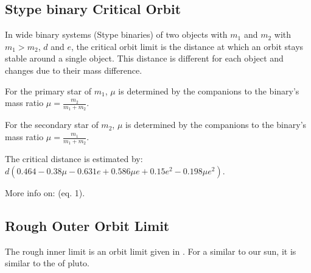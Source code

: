\documentclass[letterpaper,10pt,english]{sphinxmanual}
\begin{document}
\subsection{S\sphinxhyphen{}type binary Critical Orbit}
\label{\detokenize{quantities/children_orbit_limits/s_type_critical_orbit:s-type-binary-critical-orbit}}\label{\detokenize{quantities/children_orbit_limits/s_type_critical_orbit::doc}}\label{\detokenize{quantities/children_orbit_limits/s_type_critical_orbit:s-type-critical-orbit}}
\sphinxAtStartPar
In wide binary systems (S\sphinxhyphen{}type binaries) of two objects with {\hyperref[\detokenize{quantities/material/mass:id1}]{}}
\(m_1\) and \(m_2\) with \(m_1 > m_2\), {\hyperref[\detokenize{quantities/orbital/semi_major_axis:id1}]{}} \(d\)
and {\hyperref[\detokenize{quantities/orbital/eccentricity:id1}]{}} \(e\), the critical orbit limit is the 
distance at which an orbit stays stable around a single object.
This distance is different for each object and changes due to their mass difference.

\sphinxAtStartPar
For the primary star of {\hyperref[\detokenize{quantities/material/mass:id1}]{}} \(m_1\), \(\mu\) is determined
by the companions to the binary’s mass ratio \(\mu = \frac{m_2}{m_1 + m_2}\).

\sphinxAtStartPar
For the secondary star of {\hyperref[\detokenize{quantities/material/mass:id1}]{}} \(m_2\), \(\mu\) is determined
by the companions to the binary’s mass ratio \(\mu = \frac{m_1}{m_1 + m_2}\).

\sphinxAtStartPar
The critical distance is estimated by: \(d (0.464 - 0.38 \mu - 0.631 e + 0.586 \mu e + 0.15 e^2 - 0.198 \mu e^2)\).

\sphinxAtStartPar
More info on:  (eq. 1).


\subsection{Rough Outer Orbit Limit}
\label{\detokenize{quantities/children_orbit_limits/rough_outer_orbit_limit:rough-outer-orbit-limit}}\label{\detokenize{quantities/children_orbit_limits/rough_outer_orbit_limit::doc}}
\sphinxAtStartPar
The rough inner limit is an orbit limit given in .
For a {\hyperref[\detokenize{celestial_bodies/star:id1}]{}} similar to our sun, it is similar to the {\hyperref[\detokenize{quantities/orbital/semi_major_axis:id1}]{}}
of pluto.
\end{document}
